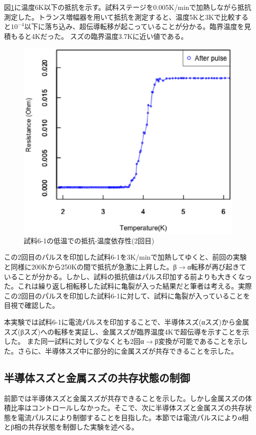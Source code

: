 図\ref{fig:181228_after_pulse}に温度6K以下の抵抗を示す。試料ステージを0.005K/minで加熱しながら抵抗測定した。トランス増幅器を用いて抵抗を測定すると、温度5Kと3Kで比較すると$10^{-4}$以下に落ち込み、超伝導転移が起こっていることが分かる。臨界温度を見積もると4Kだった。
スズの臨界温度3.7Kに近い値である。
\begin{figure}[!h]
\begin{center}
   \includegraphics[width=0.5\hsize]{results_discussions/181228_after_pulse.eps}
  \end{center}
  \caption{試料6-1の低温での抵抗-温度依存性(2回目)}
  \label{fig:181228_after_pulse}
\end{figure}

この2回目のパルスを印加した試料6-1を3K/minで加熱してゆくと、前回の実験と同様に200Kから250Kの間で抵抗が急激に上昇した。β$\to$α転移が再び起きていることが分かる。しかし、試料の抵抗値はパルス印加する前よりも大きくなった。これは繰り返し相転移した試料に亀裂が入った結果だと筆者は考える。実際この2回目のパルスを印加した試料6-1に対して、試料に亀裂が入っていることを目視で確認した。

本実験では試料6-1に電流パルスを印加することで、半導体スズ(αスズ)から金属スズ(βスズ)への転移を実証し、金属スズが臨界温度4Kで超伝導を示すことを示した。
また同一試料に対して少なくとも2回α$\to$β変換が可能であることを示した。さらに、半導体スズ中に部分的に金属スズが共存できることを示した。

\subsection{半導体スズと金属スズの共存状態の制御}
前節では半導体スズと金属スズが共存できることを示した。しかし金属スズの体積比率はコントロールしなかった。そこで、次に半導体スズと金属スズの共存状態を電流パルスにより制御することを目指した。本節では電流パルスによりα相とβ相の共存状態を制御した実験を述べる。

